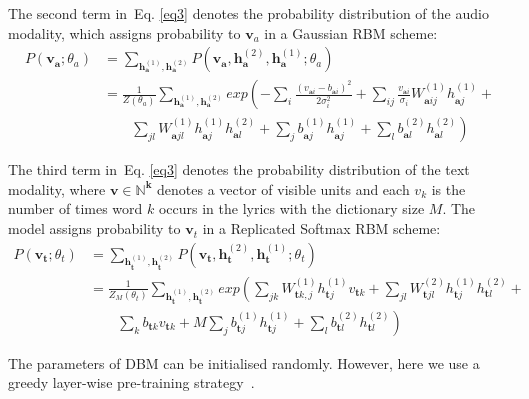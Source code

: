 \documentclass{llncs}
\begin{document}
The second term in~Eq. \ref{eq3} denotes the probability distribution of the audio modality, which assigns probability to $\mathbf{v}_{a}$ in a Gaussian RBM scheme:
\begin{equation}
\begin{split}\label{al1}
P(\mathbf{v}_{\mathbf{a}};\theta_{a}) &= \sum_{\mathbf{h}_{\mathbf{a}}^{(1)},\mathbf{h}_{\mathbf{a}}^{(2)}}P(\mathbf{v}_{\mathbf{a}},\mathbf{h}_{\mathbf{a}}^{(2)},\mathbf{h}_{\mathbf{a}}^{(1)};\theta_{a}) \\
&= \frac{1}{\mathit{Z}(\theta_{a})}\sum_{\mathbf{h}_{\mathbf{a}}^{(1)},\mathbf{h}_{\mathbf{a}}^{(2)}}exp\left(-\sum_{i}\frac{{(v_{\mathbf{a}i}-b_{\mathbf{a}i})}^{2}}{2\sigma_{i}^{2}}+\sum_{ij}\frac{v_{\mathbf{a}i}}{\sigma_{i}}W_{\mathbf{a}ij}^{(1)}h_{\mathbf{a}j}^{(1)}+\right. \\
&\left.\qquad\sum_{jl}W_{\mathbf{a}jl}^{(1)}h_{\mathbf{a}j}^{(1)}h_{\mathbf{a}l}^{(2)}+\sum_{j}b_{\mathbf{a}j}^{(1)}h_{\mathbf{a}j}^{(1)}+\sum_{l}b_{\mathbf{a}l}^{(2)}h_{\mathbf{a}l}^{(2)}\right)
\end{split}
\end{equation}

The third term in~Eq. \ref{eq3} denotes the probability distribution of the text modality, where $\mathbf{v\in \mathbb{N}^{k}}$ denotes a vector of visible units and each ${v}_{k}$ is the number of times word $k$ occurs in the lyrics with the dictionary size $M$. The model assigns probability to $\mathbf{v}_{t}$ in a Replicated Softmax RBM scheme:
\begin{equation}
\begin{split}\label{al2}
P(\mathbf{v}_{\mathbf{t}};\theta_{t}) &= \sum_{\mathbf{h}_{\mathbf{t}}^{(1)},\mathbf{h}_{\mathbf{t}}^{(2)}}P(\mathbf{v}_{\mathbf{t}},\mathbf{h}_{\mathbf{t}}^{(2)},\mathbf{h}_{\mathbf{t}}^{(1)};\theta_{t}) \\
&= \frac{1}{\mathit{Z}_{M}(\theta_{t})}\sum_{\mathbf{h}_{\mathbf{t}}^{(1)},\mathbf{h}_{\mathbf{t}}^{(2)}}exp\left(\sum_{jk}W_{\mathbf{t}k,j}^{(1)}h_{\mathbf{t}j}^{(1)}v_{\mathbf{t}k}+\sum_{jl}W_{\mathbf{t}jl}^{(2)}h_{\mathbf{t}j}^{(1)}h_{\mathbf{t}l}^{(2)}+\right. \\
&\left.\qquad\sum_{k}b_{\mathbf{t}k}v_{\mathbf{t}k}+M\sum_{j}b_{\mathbf{t}j}^{(1)}h_{\mathbf{t}j}^{(1)}+\sum_{l}b_{\mathbf{t}l}^{(2)}h_{\mathbf{t}l}^{(2)}\right)
\end{split}
\end{equation}

The parameters of DBM can be initialised randomly. However, here we use a greedy layer-wise pre-training strategy~\cite{DBLP:journals/jmlr/SalakhutdinovH09,DBLP:journals/jmlr/SrivastavaS14}. %
\end{document}
